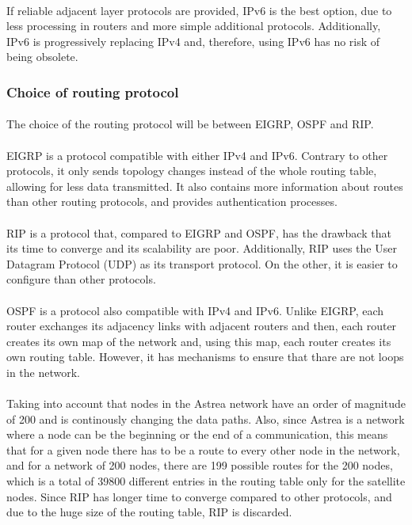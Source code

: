 \begin{itemize}
\paragraph{}If reliable adjacent layer protocols are provided, IPv6 is the best option, due to less processing in routers and more simple additional protocols. Additionally, IPv6 is progressively replacing IPv4 and, therefore, using IPv6 has no risk of being obsolete.

\subsubsection{Choice of routing protocol}
\paragraph{}The choice of the routing protocol will be between EIGRP, OSPF and RIP.
\paragraph{}EIGRP is a protocol compatible with either IPv4 and IPv6. Contrary to other protocols, it only sends topology changes instead of the whole routing table, allowing for less data transmitted. It also contains more information about routes than other routing protocols, and provides authentication processes.
\paragraph{}RIP is a protocol that, compared to EIGRP and OSPF, has the drawback that its time to converge and its scalability are poor. Additionally, RIP uses the User Datagram Protocol (UDP) as its transport protocol. On the other, it is easier to configure than other protocols.
\paragraph{}OSPF is a protocol also compatible with IPv4 and IPv6. Unlike EIGRP, each router exchanges its adjacency links with adjacent routers and then, each router creates its own map of the network and, using this map, each router creates its own routing table. However, it has mechanisms to ensure that thare are not loops in the network.
\paragraph{}Taking into account that nodes in the Astrea network have an order of magnitude of 200 and is continously changing the data paths. Also, since Astrea is a network where a node can be the beginning or the end of a communication, this means that for a given node there has to be a route to every other node in the network, and for a network of 200 nodes, there are 199 possible routes for the 200 nodes, which is a total of 39800 different entries in the routing table only for the satellite nodes. Since RIP has longer time to converge compared to other protocols, and due to the huge size of the routing table, RIP is discarded.

\end{itemize}
